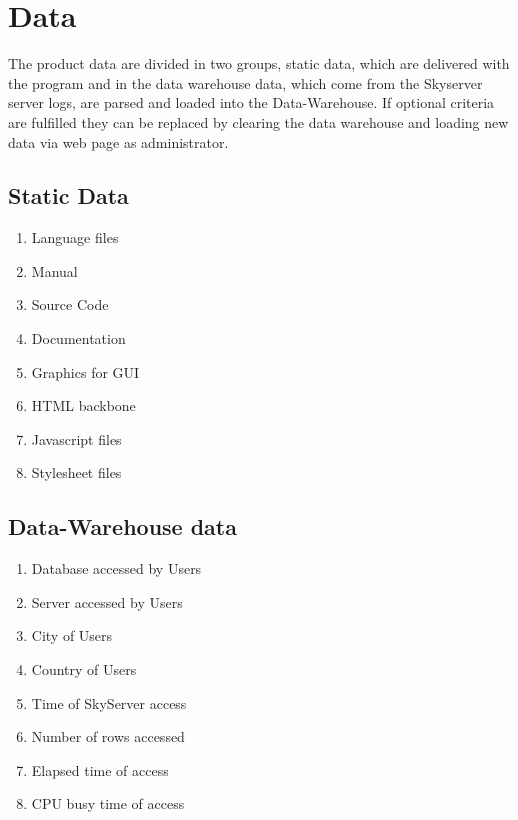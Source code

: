 \section{Data}
The product data are divided in two groups, static data, 
which are delivered with the program and in the data warehouse data, 
which come from the Skyserver server logs, are parsed 
and loaded into the Data-Warehouse. If optional criteria are fulfilled they can be replaced 
by clearing the data warehouse and loading new data via web page as administrator.

\renewcommand{\theenumi}{/D\arabic{enumi}0/}
\renewcommand{\labelenumi}{\theenumi}

\subsection{Static Data}

\begin{enumerate}
  \item Language files
  \item Manual
  \item Source Code
  \item Documentation
  \item Graphics for GUI
  \item HTML backbone
  \item Javascript files
  \item Stylesheet files
\end{enumerate}

\subsection{Data-Warehouse data}

\begin{enumerate}[resume] %
  \item Database accessed by Users
  \item Server accessed by Users
  \item City of Users
  \item Country of Users
  \item Time of SkyServer access
  \item Number of rows accessed
  \item Elapsed time of access
  \item CPU busy time of access
\end{enumerate}

